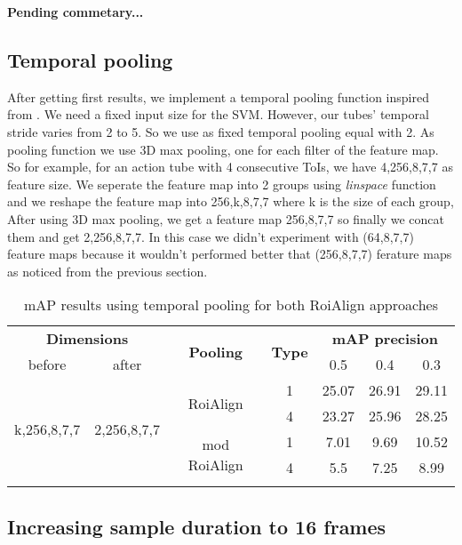 \textbf{Pending commetary...}
\\

\subsection{Temporal pooling}
After getting first results, we implement a temporal pooling function inspired from \cite{DBLP:journals/corr/HouCS17}. We need a
fixed input size for the SVM. However, our tubes' temporal stride varies from 2 to 5. So we use as fixed temporal pooling equal
with 2. As pooling function we use 3D max pooling, one for each filter of the feature map.  So for example, for an action tube
with 4 consecutive ToIs, we  have 4,256,8,7,7 as feature size. We seperate the feature map into 2 groups using \textit{linspace}
function and we reshape the feature map into 256,k,8,7,7 where k is the size of each group, After using 3D max pooling, we get
a feature map 256,8,7,7 so finally we concat them and get 2,256,8,7,7. In this case we didn't experiment with (64,8,7,7) feature
maps because it wouldn't performed better that (256,8,7,7) ferature maps as noticed from the previous section.

\begin{center}
\begin{longtable}{||c | c| c| c||c c c||}

  \hline
 \multicolumn{2}{||c|}{\textbf{Dimensions}} & \multirow{2}{*}{\textbf{Pooling}} &\multirow{2}{*}{ \textbf{Type}} &\multicolumn{3}{|c||}{\textbf{mAP precision}}\\

  before & after & {} & {} & 0.5 &  0.4 & 0.3\\
  \hline   \hline

  \multirow{4}{*}{k,256,8,7,7} & \multirow{4}{*}{2,256,8,7,7} & \multirow{2}{*}{RoiAlign}  & 1 & 25.07 & 26.91 & 29.11 \\
  \cline{4-7}
  {} & {} & {} & 4 &  23.27 & 25.96 & 28.25 \\
  \cline{3-7}
  {} & {} & \multirow{2}{*}{mod RoiAlign} & 1 & 7.01 & 9.69 & 10.52 \\
  \cline{4-7}
  {} & {} & {} & 4 & 5.5 & 7.25 & 8.99 \\
  \hline

  \caption{mAP results using temporal pooling for both RoiAlign approaches}
  \label{table:svm_temp_pooling}
\end{longtable} 
\end{center}

\subsection{Increasing sample duration to 16 frames}

